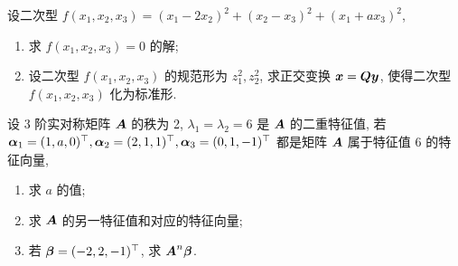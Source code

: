 \begin{example}
    设二次型 $f(x_1,x_2,x_3)=(x_1-2x_2)^2+(x_2-x_3)^2+(x_1+ax_3)^2$,
    \begin{enumerate}[label=(\arabic{*})]
        \item 求 $f(x_1, x_2, x_3)=0$ 的解;
        \item 设二次型 $f(x_1, x_2, x_3)$ 的规范形为 $z_1^2, z_2^2$, 求正交变换 $\vb*{x}=\vb*{Qy}$, 使得二次型 $f(x_1, x_2, x_3)$ 化为标准形.
    \end{enumerate}
\end{example}
\begin{solution}
    
\end{solution}

\begin{example}
    设 3 阶实对称矩阵 $\vb*{A}$ 的秩为 2, $\lambda_1= \lambda_2=6$ 是 $\vb*{A}$ 的二重特征值, 若 $\vb*{\alpha}_1=(1,a,0)^\top,\vb*{\alpha}_2=(2,1,1)^\top,\vb*{\alpha}_3=(0,1,-1)^\top$ 都是矩阵 $\vb*{A}$ 属于特征值 6 的特征向量,
    \begin{enumerate}[label=(\arabic{*})]
        \item 求 $a$ 的值;
        \item 求 $\vb*{A}$ 的另一特征值和对应的特征向量;
        \item 若 $\vb*{\beta}=(-2,2,-1)^\top$, 求 $\vb*{A}^{n}\vb*{\beta}$.
    \end{enumerate}
\end{example}
